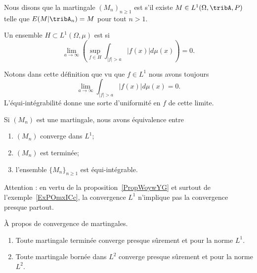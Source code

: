 \begin{definition}
    Nous disons que la martingale \( (M_n)_{n\geq 1}\) est  s'il existe \( M\in L^1(\Omega,\tribA,P)\) telle que \( E(M|\tribA_n)=M\) pour tout \( n>1\).
\end{definition}

\begin{definition}  \label{DefOZlZnse}
    Un ensemble \( H\subset L^1(\Omega,\mu)\) est  si
    \begin{equation}
        \lim_{a\to \infty}\left( \sup_{f\in H}\int_{  | f |>a   }| f(x) |d\mu(x) \right)=0.
    \end{equation}
\end{definition}
Notons dans cette définition que vu que \( f\in L^1\) nous avons toujours
\begin{equation}
    \lim_{a\to \infty}\int_{| f |>a}| f(x) |d\mu(x)=0.
\end{equation}
L'équi-intégrabilité donne une sorte d'uniformité en \( f\) de cette limite.

\begin{theorem} \label{ThoEFbpVXb}
    Si \( (M_n)\) est une martingale, nous avons équivalence entre
    \begin{enumerate}
        \item
            \( (M_n)\) converge dans \( L^1\);
        \item
            \( (M_n)\) est terminée;
        \item
            l'ensemble \( \{ M_n \}_{n\geq 1}\) est équi-intégrable.
    \end{enumerate}
\end{theorem}

Attention : en vertu de la proposition~\ref{PropWoywYG} et surtout de l'exemple~\ref{ExPOmxICc}, la convergence \( L^1\) n'implique pas la convergence presque partout.

\begin{theorem}   \label{ThoHBvnTRk}
    À propos de convergence de martingales.
    \begin{enumerate}
        \item
            Toute martingale terminée converge presque sûrement et pour la norme \( L^1\).
        \item
            Toute martingale bornée dans \( L^2\) converge presque sûrement et pour la norme \( L^2\).
    \end{enumerate}
\end{theorem}

